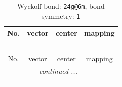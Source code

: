 \documentclass[fleqn,8pt]{jsarticle}
\begin{document}
\renewcommand{\arraystretch}{1.2}
\begin{longtable}{cccc}
\caption{Wyckoff bond: {\tt 24g@6m}, bond symmetry: {\tt 1}}
 \\
 \hline \hline
No. & vector & center & mapping \\ \hline \endfirsthead

\multicolumn{3}{l}{\tablename\ \thetable{}} \\
 \hline \hline
No. & vector & center & mapping \\ \hline \endhead

 \hline \hline
\multicolumn{3}{r}{\footnotesize\it continued ...} \\ \endfoot

 \hline \hline
\multicolumn{3}{r}{} \\ \endlastfoot


\end{longtable}
\end{document}
